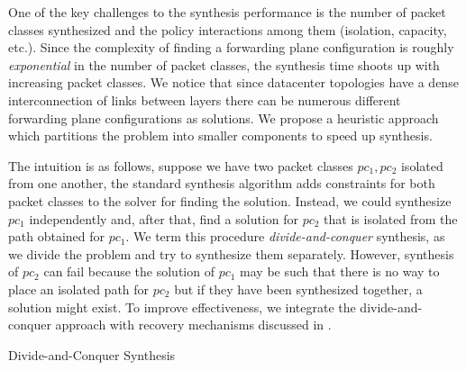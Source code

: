One of the key challenges to the synthesis performance is the number
of packet classes synthesized and the policy interactions among them
(isolation, capacity, etc.). Since the complexity of finding a
forwarding plane configuration is roughly \emph{exponential} in the
number of packet classes, the synthesis time shoots up with increasing
packet classes. 
We notice that since datacenter topologies have a dense interconnection of
links between layers there can be
numerous different forwarding plane configurations as solutions.
We propose a heuristic approach which partitions the problem 
into smaller components to speed up synthesis.

The intuition is as follows, suppose we have two packet classes $pc_1,
pc_2$ isolated from one another, the standard synthesis algorithm adds 
constraints for both packet classes to the solver for finding the solution.
Instead, we could synthesize $pc_1$
independently and, after that, find a solution for $pc_2$ 
that is isolated from the
path obtained for $pc_1$. We term this
procedure \emph{divide-and-conquer} synthesis, as we divide
the problem and try to synthesize them separately.
However, synthesis of $pc_2$ can fail because the solution
of $pc_1$ may be such that there is no way to place an isolated path for
$pc_2$ but if they have been synthesized together, a
solution might exist. To improve effectiveness, we integrate the 
divide-and-conquer approach with recovery 
mechanisms discussed in .

\begin{algorithm}[h]
\begin{footnotesize}
	\caption{Divide-and-Conquer Synthesis}
	\label{dcsyn}
	\begin{algorithmic}[1]
		\Else
		  \EndIf
		  \EndIf
		\Else
		\EndIf
		\EndWhile
		\EndIf
		\EndProcedure
	\end{algorithmic}
\end{footnotesize}
\end{algorithm}



